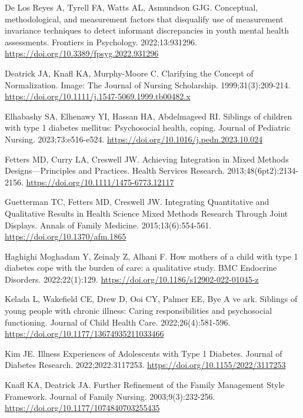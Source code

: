 \documentclass[
  turkish,
  a4paper,
  DIV=11,
  numbers=noendperiod]{scrreprt}
\newlength{\cslhangindent}
\newenvironment{CSLReferences}[2] %
 {\begin{list}{}{%
  \setlength{\itemindent}{0pt}
  \setlength{\leftmargin}{0pt}
  \setlength{\parsep}{0pt}
  \ifodd #1
   \setlength{\leftmargin}{\cslhangindent}
   \setlength{\itemindent}{-1\cslhangindent}
  \fi
  \setlength{\itemsep}{#2\baselineskip}}}
 {\end{list}}
\begin{document}
\begin{CSLReferences}{1}{0}
De Los Reyes A, Tyrell FA, Watts AL, Asmundson GJG. Conceptual,
methodological, and measurement factors that disqualify use of
measurement invariance techniques to detect informant discrepancies in
youth mental health assessments. Frontiers in Psychology.
2022;13:931296. \url{https://doi.org/10.3389/fpsyg.2022.931296}

Deatrick JA, Knafl KA, Murphy-Moore C. Clarifying the Concept of
Normalization. Image: The Journal of Nursing Scholarship.
1999;31(3):209-214.
\url{https://doi.org/10.1111/j.1547-5069.1999.tb00482.x}

Elhabashy SA, Elhenawy YI, Hassan HA, Abdelmageed RI. Siblings of
children with type 1 diabetes mellitus: Psychosocial health, coping.
Journal of Pediatric Nursing. 2023;73:e516-e524.
\url{https://doi.org/10.1016/j.pedn.2023.10.024}

Fetters MD, Curry LA, Creswell JW. Achieving Integration in Mixed
Methods Designs---Principles and Practices. Health Services Research.
2013;48(6pt2):2134-2156. \url{https://doi.org/10.1111/1475-6773.12117}

Guetterman TC, Fetters MD, Creswell JW. Integrating Quantitative and
Qualitative Results in Health Science Mixed Methods Research Through
Joint Displays. Annals of Family Medicine. 2015;13(6):554-561.
\url{https://doi.org/10.1370/afm.1865}

Haghighi Moghadam Y, Zeinaly Z, Alhani F. How mothers of a child with
type 1 diabetes cope with the burden of care: a qualitative study. BMC
Endocrine Disorders. 2022;22(1):129.
\url{https://doi.org/10.1186/s12902-022-01045-z}

Kelada L, Wakefield CE, Drew D, Ooi CY, Palmer EE, Bye A ve ark.
Siblings of young people with chronic illness: Caring responsibilities
and psychosocial functioning. Journal of Child Health Care.
2022;26(4):581-596. \url{https://doi.org/10.1177/13674935211033466}

Kim JE. Illness Experiences of Adolescents with Type 1 Diabetes. Journal
of Diabetes Research. 2022;2022:3117253.
\url{https://doi.org/10.1155/2022/3117253}

Knafl KA, Deatrick JA. Further Refinement of the Family Management Style
Framework. Journal of Family Nursing. 2003;9(3):232-256.
\url{https://doi.org/10.1177/1074840703255435}


\end{CSLReferences}
\end{document}
